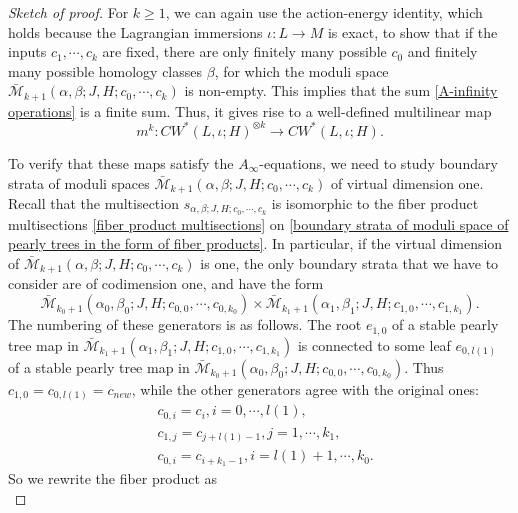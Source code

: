 \documentclass{amsart}
\numberwithin{equation}{section}
\numberwithin{figure}{section}
\begin{document}
\begin{proof}[Sketch of proof]
For $k \ge 1$, we can again use the action-energy identity, which holds because the Lagrangian immersions $\iota: L \to M$ is exact, to show that if the inputs $c_{1}, \cdots, c_{k}$ are fixed, there are only finitely many possible $c_{0}$ and finitely many possible homology classes $\beta$, for which the moduli space $\bar{\mathcal{M}}_{k+1}(\alpha, \beta; J, H; c_{0}, \cdots, c_{k})$ is non-empty. This implies that the sum \eqref{A-infinity operations} is a finite sum. Thus, it gives rise to a well-defined multilinear map
\begin{equation*}
m^{k}: CW^{*}(L, \iota; H)^{\otimes k} \to CW^{*}(L, \iota; H).
\end{equation*} \par
	To verify that these maps satisfy the $A_{\infty}$-equations, we need to study boundary strata of moduli spaces $\bar{\mathcal{M}}_{k+1}(\alpha, \beta; J, H; c_{0}, \cdots, c_{k})$ of virtual dimension one. Recall that the multisection $s_{\alpha, \beta; J, H; c_{0}, \cdots, c_{k}}$ is isomorphic to the fiber product multisections \eqref{fiber product multisections} on \eqref{boundary strata of moduli space of pearly trees in the form of fiber products}. In particular, if the virtual dimension of $\bar{\mathcal{M}}_{k+1}(\alpha, \beta; J, H; c_{0}, \cdots, c_{k})$ is one, the only boundary strata that we have to consider are of codimension one, and have the form
\begin{equation}
\bar{\mathcal{M}}_{k_{0}+1}(\alpha_{0}, \beta_{0}; J, H; c_{0, 0}, \cdots, c_{0, k_{0}}) \times \bar{\mathcal{M}}_{k_{1}+1}(\alpha_{1}, \beta_{1}; J, H; c_{1, 0}, \cdots, c_{1, k_{1}}).
\end{equation}
The numbering of these generators is as follows. The root $e_{1, 0}$ of a stable pearly tree map in $\bar{\mathcal{M}}_{k_{1}+1}(\alpha_{1}, \beta_{1}; J, H; c_{1, 0}, \cdots, c_{1, k_{1}})$ is connected to some leaf $e_{0, l(1)}$ of a stable pearly tree map in $\bar{\mathcal{M}}_{k_{0}+1}(\alpha_{0}, \beta_{0}; J, H; c_{0, 0}, \cdots, c_{0, k_{0}})$. Thus $c_{1, 0} = c_{0, l(1)} = c_{new}$, while the other generators agree with the original ones:
\begin{align}
&c_{0, i} = c_{i}, i = 0, \cdots, l(1),\\
&c_{1, j} = c_{j + l(1) - 1}, j = 1, \cdots, k_{1},\\
&c_{0, i} = c_{i + k_{1} - 1}, i = l(1) + 1, \cdots, k_{0}.
\end{align}
So we rewrite the fiber product as
\begin{equation}

\end{equation}
\end{proof}
\end{document}
